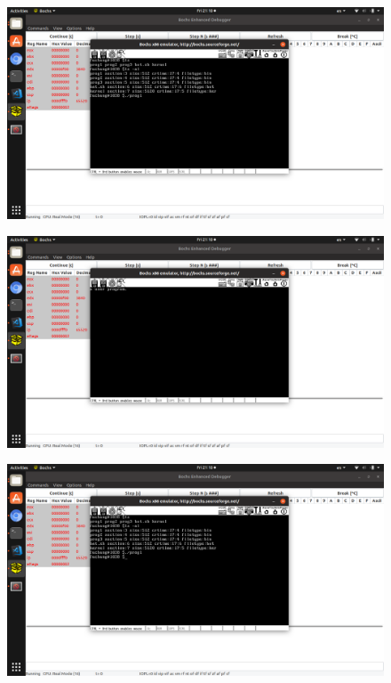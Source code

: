 \documentclass[a4paper,11pt,UTF8]{ctexart}
\newcommand{\bottomcaption}{%
\setlength{\abovecaptionskip}{6pt}%
\setlength{\belowcaptionskip}{6pt}%
\caption}
\newcommand{\xiaowuhao}{\fontsize{9pt}{\baselineskip}\selectfont}   %
\begin{document}
  \begin{figure}[!htbp]
    \centering
    \includegraphics[width=\textwidth]{imgs/Screenshot_from_2019-03-29_21-10-28.png}
    \bottomcaption{\xiaowuhao{Shot3}}
  \end{figure}
  \begin{figure}[!htbp]
    \centering
    \includegraphics[width=\textwidth]{imgs/Screenshot_from_2019-03-29_21-10-31.png}
    \bottomcaption{\xiaowuhao{Shot3}}
  \end{figure}
  \begin{figure}[!htbp]
    \centering
    \includegraphics[width=\textwidth]{imgs/Screenshot_from_2019-03-29_21-10-37.png}
    \bottomcaption{\xiaowuhao{Shot3}}
  \end{figure}
\end{document}
